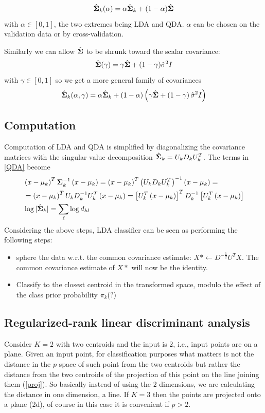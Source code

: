 \begin{equation}
\mathrm{\hat{\mathbf{\Sigma}}}_k(\alpha) = \alpha\mathrm{\hat{\mathbf{\Sigma}}}_k+(1-\alpha) \mathrm{\hat{\mathbf{\Sigma}}}
\end{equation}
with $\alpha \in [0,1]$, the two extremes being LDA and QDA. $\alpha$ can be chosen on the validation data or by cross-validation.

Similarly we can allow $\mathrm{\hat{\mathbf{\Sigma}}}$ to be shrunk toward the scalar covariance:
\begin{equation}
\mathrm{\hat{\mathbf{\Sigma}}}(\gamma) = \gamma\mathrm{\hat{\mathbf{\Sigma}}}+(1-\gamma) \hat{\sigma}^2 I
\end{equation}
with $\gamma \in [0,1]$
so we get a more general family of covariances
\begin{equation}
\mathrm{\hat{\mathbf{\Sigma}}}_k(\alpha, \gamma) = \alpha\mathrm{\hat{\mathbf{\Sigma}}}_k+\left(1-\alpha\right) \left(\gamma\mathrm{\hat{\mathbf{\Sigma}}}+\left(1-\gamma\right) \hat{\sigma}^2 I\right)
\end{equation}

\subsection{Computation}
Computation of LDA and QDA is simplified by diagonalizing the covariance matrices with the singular value decomposition $\mathrm{\hat{\mathbf{\Sigma}}}_k = U_kD_kU_k^T$. The terms in \autoref{QDA} become
\begin{align}
&\begin{aligned}
&\left( x - \mu_k \right)^T \mathbf{\Sigma}^{-1}_k\left( x - \mu_k \right)= \left( x - \mu_k \right)^T \left(U_kD_kU_k^T\right)^{-1}\left( x - \mu_k \right) =\\
&= \left( x - \mu_k \right)^T U_kD_k^{-1}U_k^T\left( x - \mu_k \right) =  \left[ U_k^T\left( x - \mu_k \right)\right]^T D_k^{-1}\left[ U_k^T\left( x - \mu_k \right)\right]
\end{aligned}\\
& \log |\mathrm{\hat{\mathbf{\Sigma}}}_k| = \sum_\ell \log d_{kl}
\end{align}
Considering the above steps, LDA classifier can be seen as performing the following steps:
\begin{itemize}
\item sphere the data w.r.t. the common covariance estimate: $X*\leftarrow D^{-\frac{1}{2}} U^T X$. The common covariance estimate of $X*$ will now be the identity.
\item Classify to the closest centroid in the transformed space, modulo the effect of the class prior probability $\pi_k$(?)
\end{itemize}
\subsection{Regularized-rank linear discriminant analysis}
Consider $K=2$ with two centroids and the input is $2$, i.e., input points are on a plane. Given an input point, for classification purposes what matters is not the distance in the $p$ space of such point from the two centroids but rather the distance from the two centroids of the projection of this point on the line joining them (\autoref{proj}). So basically instead of using the $2$ dimensions, we are calculating the distance in one dimension, a line. If $K=3$ then the points are projected onto a plane (2d), of course in this case it is convenient if $p>2$.

